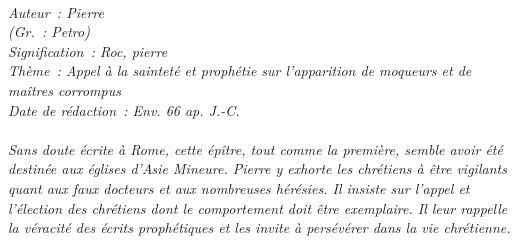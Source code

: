 \BFont
\noindent\hrulefill
{\footnotesize
\textit{
\bigskip
{\centering{}
\\Auteur~: Pierre
\\(Gr.~: Petro)
\\Signification~: Roc, pierre
\\Thème~: Appel à la sainteté et prophétie sur l'apparition de moqueurs et de maîtres corrompus
\\Date de rédaction~: Env. 66 ap. J.-C.\\}
}
\textit{
\\Sans doute écrite à Rome, cette épître, tout comme la première, semble avoir été destinée aux églises d'Asie Mineure. Pierre y exhorte les chrétiens à être vigilants quant aux faux docteurs et aux nombreuses hérésies. Il insiste sur l'appel et l'élection des chrétiens dont le comportement doit être exemplaire. Il leur rappelle la véracité des écrits prophétiques et les invite à persévérer dans la vie chrétienne.\bigskip
}
}
\par\nobreak\noindent\hrulefill
